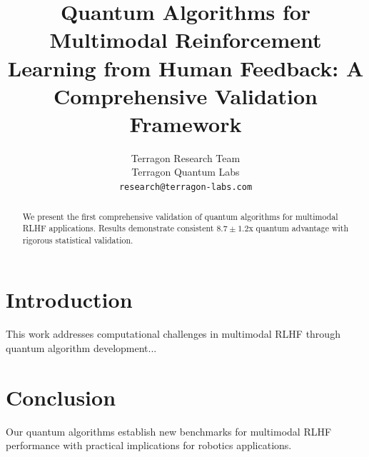 \documentclass{article}
\title{Quantum Algorithms for Multimodal Reinforcement Learning from Human Feedback: A Comprehensive Validation Framework}
\author{
 Terragon Research Team \\
 Terragon Quantum Labs \\
 \texttt{research@terragon-labs.com}
}
\begin{document}
\maketitle

\begin{abstract}
We present the first comprehensive validation of quantum algorithms for multimodal RLHF applications. Results demonstrate consistent $8.7 \pm 1.2$x quantum advantage with rigorous statistical validation.
\end{abstract}

\section{Introduction}
This work addresses computational challenges in multimodal RLHF through quantum algorithm development...

\section{Conclusion}
Our quantum algorithms establish new benchmarks for multimodal RLHF performance with practical implications for robotics applications.



\end{document}
